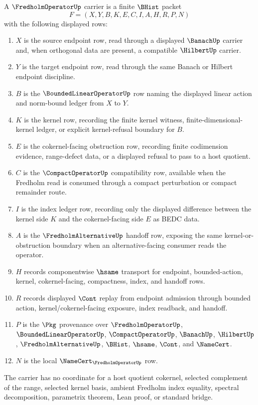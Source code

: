 \begin{definition}
\label{def:fredholm-operator-carrier}
A $\FredholmOperatorUp$ carrier is a finite $\BHist$ packet
$$
F=(X,Y,B,K,E,C,I,A,H,R,P,N)
$$
with the following displayed rows:
\begin{enumerate}
\item $X$ is the source endpoint row, read through a displayed $\BanachUp$ carrier and, when orthogonal data are present, a compatible $\HilbertUp$ carrier.
\item $Y$ is the target endpoint row, read through the same Banach or Hilbert endpoint discipline.
\item $B$ is the $\BoundedLinearOperatorUp$ row naming the displayed linear action and norm-bound ledger from $X$ to $Y$.
\item $K$ is the kernel row, recording the finite kernel witness, finite-dimensional-kernel ledger, or explicit kernel-refusal boundary for $B$.
\item $E$ is the cokernel-facing obstruction row, recording finite codimension evidence, range-defect data, or a displayed refusal to pass to a host quotient.
\item $C$ is the $\CompactOperatorUp$ compatibility row, available when the Fredholm read is consumed through a compact perturbation or compact remainder route.
\item $I$ is the index ledger row, recording only the displayed difference between the kernel side $K$ and the cokernel-facing side $E$ as BEDC data.
\item $A$ is the $\FredholmAlternativeUp$ handoff row, exposing the same kernel-or-obstruction boundary when an alternative-facing consumer reads the operator.
\item $H$ records componentwise $\hsame$ transport for endpoint, bounded-action, kernel, cokernel-facing, compactness, index, and handoff rows.
\item $R$ records displayed $\Cont$ replay from endpoint admission through bounded action, kernel/cokernel-facing exposure, index readback, and handoff.
\item $P$ is the $\Pkg$ provenance over $\FredholmOperatorUp$, $\BoundedLinearOperatorUp$, $\CompactOperatorUp$, $\BanachUp$, $\HilbertUp$, $\FredholmAlternativeUp$, $\BHist$, $\hsame$, $\Cont$, and $\NameCert$.
\item $N$ is the local $\NameCert_{\FredholmOperatorUp}$ row.
\end{enumerate}
The carrier has no coordinate for a host quotient cokernel, selected complement of the range, selected kernel basis, ambient Fredholm index equality, spectral decomposition, parametrix theorem, Lean proof, or standard bridge.
\end{definition}

